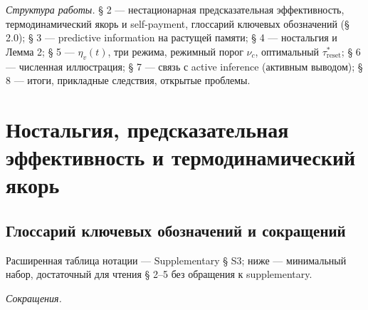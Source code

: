 \documentclass[pdflatex,sn-mathphys-ay]{sn-jnl}
\begin{document}
\emph{Структура работы.} § 2 --- нестационарная предсказательная эффективность, термодинамический якорь и self-payment, глоссарий ключевых обозначений (§ 2.0); § 3 --- predictive information на растущей памяти; § 4 --- ностальгия и Лемма 2; § 5 --- \(\eta_v(t)\), три режима, режимный порог \(\nu_c\), оптимальный \(\tau_{\text{reset}}^*\); § 6 --- численная иллюстрация; § 7 --- связь с active inference (активным выводом); § 8 --- итоги, прикладные следствия, открытые проблемы.



\section{Ностальгия, предсказательная эффективность и термодинамический якорь}\label{ux43dux43eux441ux442ux430ux43bux44cux433ux438ux44f-ux43fux440ux435ux434ux441ux43aux430ux437ux430ux442ux435ux43bux44cux43dux430ux44f-ux44dux444ux444ux435ux43aux442ux438ux432ux43dux43eux441ux442ux44c-ux438-ux442ux435ux440ux43cux43eux434ux438ux43dux430ux43cux438ux447ux435ux441ux43aux438ux439-ux44fux43aux43eux440ux44c}



\subsection{Глоссарий ключевых обозначений и сокращений}\label{ux433ux43bux43eux441ux441ux430ux440ux438ux439-ux43aux43bux44eux447ux435ux432ux44bux445-ux43eux431ux43eux437ux43dux430ux447ux435ux43dux438ux439-ux438-ux441ux43eux43aux440ux430ux449ux435ux43dux438ux439}



Расширенная таблица нотации --- Supplementary § S3; ниже --- минимальный набор, достаточный для чтения § 2--5 без обращения к supplementary.



\emph{Сокращения.}
\end{document}
